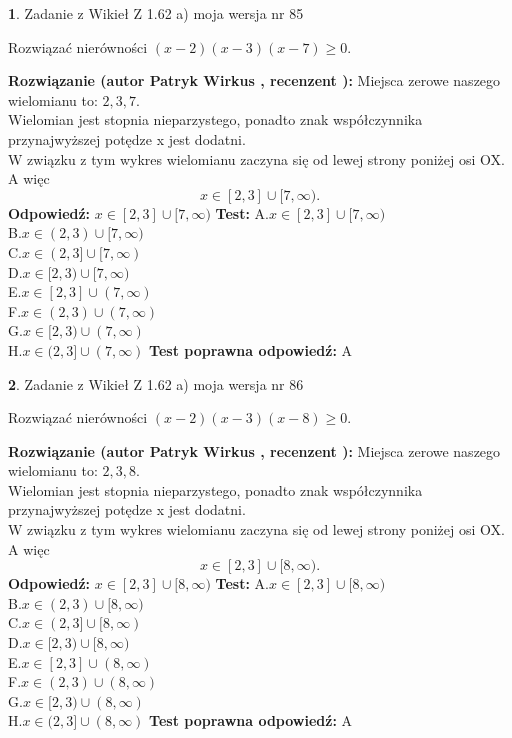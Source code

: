 \documentclass[12pt, a4paper]{article}
\theoremstyle{definition} %
\newtheorem{zad}{}
\newcommand{\zadStart}[1]{\begin{zad}#1\newline}
\newcommand{\zadStop}{\end{zad}}
\newcommand{\rozwStart}[2]{\noindent \textbf{Rozwiązanie (autor #1 , recenzent #2): }\newline}
\newcommand{\rozwStop}{\newline}
\newcommand{\odpStart}{\noindent \textbf{Odpowiedź:}\newline}
\newcommand{\odpStop}{\newline}
\newcommand{\testStart}{\noindent \textbf{Test:}\newline}
\newcommand{\testStop}{\newline}
\newcommand{\kluczStart}{\noindent \textbf{Test poprawna odpowiedź:}\newline}
\newcommand{\kluczStop}{\newline}
\begin{document}
\zadStart{Zadanie z Wikieł Z 1.62 a) moja wersja nr 85}

Rozwiązać nierówności $(x-2)(x-3)(x-7)\ge0$.
\zadStop
\rozwStart{Patryk Wirkus}{}
Miejsca zerowe naszego wielomianu to: $2, 3, 7$.\\
Wielomian jest stopnia nieparzystego, ponadto znak współczynnika przy\linebreak najwyższej potędze x jest dodatni.\\ W związku z tym wykres wielomianu zaczyna się od lewej strony poniżej osi OX. A więc $$x \in [2,3] \cup [7,\infty).$$
\rozwStop
\odpStart
$x \in [2,3] \cup [7,\infty)$
\odpStop
\testStart
A.$x \in [2,3] \cup [7,\infty)$\\
B.$x \in (2,3) \cup [7,\infty)$\\
C.$x \in (2,3] \cup [7,\infty)$\\
D.$x \in [2,3) \cup [7,\infty)$\\
E.$x \in [2,3] \cup (7,\infty)$\\
F.$x \in (2,3) \cup (7,\infty)$\\
G.$x \in [2,3) \cup (7,\infty)$\\
H.$x \in (2,3] \cup (7,\infty)$
\testStop
\kluczStart
A
\kluczStop



\zadStart{Zadanie z Wikieł Z 1.62 a) moja wersja nr 86}

Rozwiązać nierówności $(x-2)(x-3)(x-8)\ge0$.
\zadStop
\rozwStart{Patryk Wirkus}{}
Miejsca zerowe naszego wielomianu to: $2, 3, 8$.\\
Wielomian jest stopnia nieparzystego, ponadto znak współczynnika przy\linebreak najwyższej potędze x jest dodatni.\\ W związku z tym wykres wielomianu zaczyna się od lewej strony poniżej osi OX. A więc $$x \in [2,3] \cup [8,\infty).$$
\rozwStop
\odpStart
$x \in [2,3] \cup [8,\infty)$
\odpStop
\testStart
A.$x \in [2,3] \cup [8,\infty)$\\
B.$x \in (2,3) \cup [8,\infty)$\\
C.$x \in (2,3] \cup [8,\infty)$\\
D.$x \in [2,3) \cup [8,\infty)$\\
E.$x \in [2,3] \cup (8,\infty)$\\
F.$x \in (2,3) \cup (8,\infty)$\\
G.$x \in [2,3) \cup (8,\infty)$\\
H.$x \in (2,3] \cup (8,\infty)$
\testStop
\kluczStart
A
\kluczStop
\end{document}
